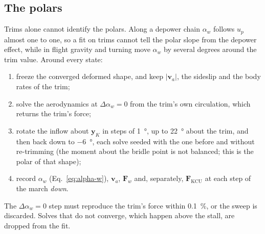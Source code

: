 \documentclass[11pt,a4paper]{article}
\begin{document}
\subsection{The polars}
\label{sec:data-sweeps}
Trims alone cannot identify the polars. Along a depower chain $\alpha_w$ follows
$u_p$ almost one to one, so a fit on trims cannot tell the polar slope from the
depower effect, while in flight gravity and turning move $\alpha_w$ by several
degrees around the trim value. Around every state:
\begin{enumerate}
  \item freeze the converged deformed shape, and keep $|\mathbf v_a|$, the sideslip
        and the body rates of the trim;
  \item solve the aerodynamics at $\Delta\alpha_w=0$ from the trim's own circulation,
        which returns the trim's force;
  \item rotate the inflow about $\mathbf y_K$ in steps of \SI{1}{\degree}, up to
        \SI{+22}{\degree} about the trim, and then back down to \SI{-6}{\degree}, each
        solve seeded with the one before and without re-trimming (the moment about
        the bridle point is not balanced; this is the polar of that shape);
  \item record $\alpha_w$ (Eq.~\ref{eq:alpha-w}), $\mathbf v_a$, $\mathbf F_w$ and,
        separately, $\mathbf F_\mathrm{KCU}$ at each step of the march \emph{down}.
\end{enumerate}
The $\Delta\alpha_w=0$ step must reproduce the trim's force within \SI{0.1}{\percent},
or the sweep is discarded. Solves that do not converge, which happen above the stall,
are dropped from the fit.
\end{document}

